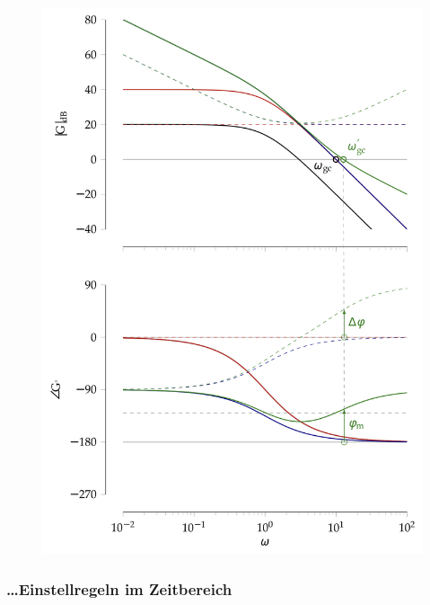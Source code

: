 \documentclass[
  10pt,
  a4paper,
  twocolumn]{article}
\numberwithin{equation}{section}
\begin{document}
\begin{tcolorbox}
\begin{figure}[H]

{\centering \includegraphics{images/pid_regler/auslegung_bodediagramm.png}

}

\end{figure}

\end{tcolorbox}

\hypertarget{einstellregeln-im-zeitbereich}{%
\subsubsection{\ldots Einstellregeln im
Zeitbereich}\label{einstellregeln-im-zeitbereich}}
\end{document}
